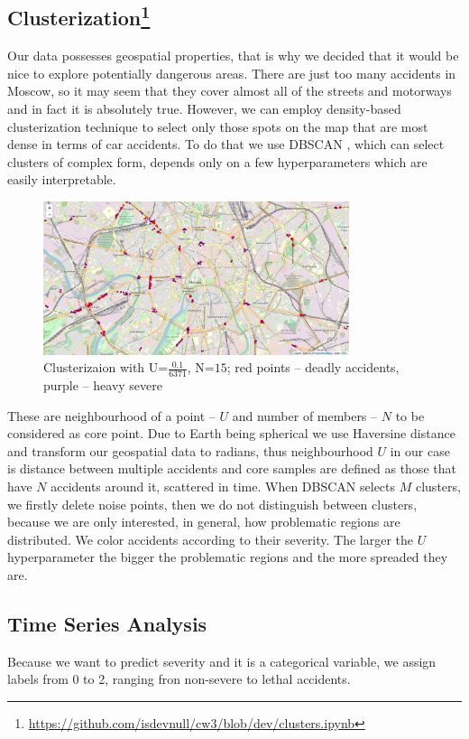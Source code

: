 \subsection[Clusterization]{Clusterization\footnote{\href{https://github.com/isdevnull/cw3/blob/dev/clusters.ipynb}
{https://github.com/isdevnull/cw3/blob/dev/clusters.ipynb}}}
Our data possesses geospatial properties, that is why we decided that it would be nice to explore potentially dangerous areas. There are just too
many accidents in Moscow, so it may seem that they cover almost all of the streets and motorways and in fact it is absolutely true. However,
we can employ density-based clusterization technique to select only those spots on the map that are most dense in terms of car accidents. To do that
we use DBSCAN \cite{DBSCAN}, which can select clusters of complex form, depends only on a few hyperparameters which are easily interpretable.
\begin{figure}[H]
	\centering
	\includegraphics[width=0.8\textwidth]{../imgs/png_files/msc_problem_regions.png}
	\caption{Clusterizaion with U=$\frac{0.1}{6371}$, N=$15$; red points – deadly accidents, purple – heavy severe}
	\label{fig:DBSCAN}
\end{figure}
These are neighbourhood of a point – $U$ and number of members – $N$ to be considered as core point.
Due to Earth being spherical we use Haversine distance and
transform our geospatial data to radians, thus neighbourhood $U$ in our case is distance between multiple accidents and core samples are defined as
those that have $N$ accidents around it, scattered in time. When DBSCAN selects $M$ clusters, we firstly delete noise points, then we do not
distinguish between clusters, because we are only interested, in general, how problematic regions are distributed. We color accidents according
to their severity. The larger the $U$ hyperparameter the bigger the problematic regions and the more spreaded they are.
\subsection{Time Series Analysis}

Because we want to predict severity and it is a categorical variable, we assign labels from 0 to 2, ranging fron non-severe to lethal accidents.
